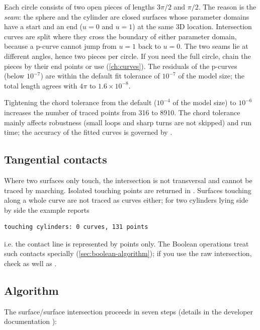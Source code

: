 Each circle consists of two open pieces of lengths $3\pi/2$ and $\pi/2$. The reason is the
\emph{seam}: the sphere and the cylinder are closed surfaces whose parameter domains have a
start and an end ($u=0$ and $u=1$) at the same 3D location. Intersection curves are split
where they cross the boundary of either parameter domain, because a p-curve cannot jump from
$u=1$ back to $u=0$. The two seams lie at different angles, hence two pieces per circle. If
you need the full circle, chain the pieces by their end points or use
 (\cref{ch:curves}). The residuals of the p-curves (below $10^{-7}$) are within
the default fit tolerance of $10^{-7}$ of the model size; the total length agrees with
$4\pi$ to $1.6\times10^{-8}$.

Tightening the chord tolerance from the default ($10^{-4}$ of the model size) to $10^{-6}$
increases the number of traced points from 316 to 8910. The chord tolerance mainly affects
robustness (small loops and sharp turns are not skipped) and run time; the accuracy of the
fitted curves is governed by .

\subsection{Tangential contacts}

Where two surfaces only touch, the intersection is not transversal and cannot be traced by
marching. Isolated touching points are returned in . Surfaces touching along a
whole curve are not traced as curves either; for two cylinders lying side by side the example
reports

\begin{lstlisting}[style=text]
touching cylinders: 0 curves, 131 points
\end{lstlisting}

i.e. the contact line is represented by points only. The Boolean operations treat such
contacts specially (\cref{sec:boolean-algorithm}); if you use the raw intersection,
check  as well as .

\subsection{Algorithm}

The surface/surface intersection proceeds in seven steps (details in the developer
documentation ):

